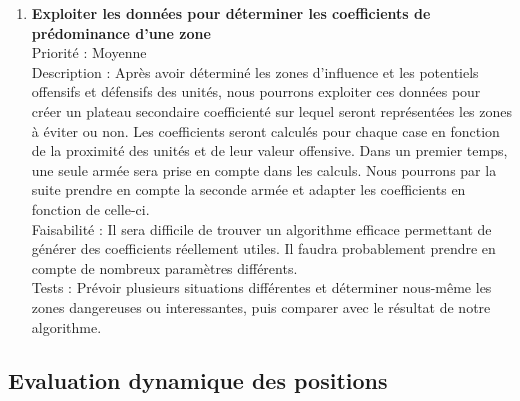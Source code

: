 \documentclass[12pt]{article}
\begin{document}
\begin{enumerate}
				\item \textbf{Exploiter les données pour déterminer les coefficients de prédominance d'une zone} \\[0.7\baselineskip]
				Priorité : Moyenne \\[0.7\baselineskip]
				Description : Après avoir déterminé les zones d'influence et les potentiels offensifs et défensifs des unités, nous pourrons exploiter ces données pour créer un plateau secondaire coefficienté sur lequel seront représentées les zones à éviter ou non. Les coefficients seront calculés pour chaque case en fonction de la proximité des unités et de leur valeur offensive. Dans un premier temps, une seule armée sera prise en compte dans les calculs. Nous pourrons par la suite prendre en compte la seconde armée et adapter les coefficients en fonction de celle-ci. \\[0.7\baselineskip]
				Faisabilité : Il sera difficile de trouver un algorithme efficace permettant de générer des coefficients réellement utiles. Il faudra probablement prendre en compte de nombreux paramètres différents. \\[0.7\baselineskip]
				Tests : Prévoir plusieurs situations différentes et déterminer nous-même les zones dangereuses ou interessantes, puis comparer avec le résultat de notre algorithme. \\[0.7\baselineskip]
				
			\end{enumerate}

		\subsection{Evaluation dynamique des positions}
\end{document}
